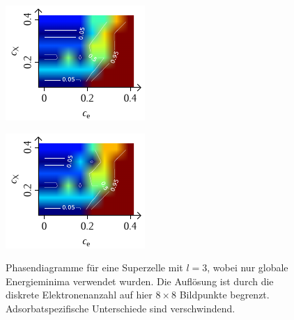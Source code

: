 \documentclass[a4paper, 10pt, twoside, openany]{book} %
\begin{document}
\begin{figure}[b]
    \begin{minipage}[t]{0.31\textwidth}
        \includegraphics[width=\textwidth]{Abbildungen/Phasendiagramme/Exakt/H_P.pdf}
        \label{HPx}
    \end{minipage}
    \hfill
    \parbox[b]{0.3\textwidth}{
        \caption[Phasendiagramme für globale Minima kleiner Systeme]{Phasendiagramme für eine Superzelle mit $l = 3$, wobei nur globale Energieminima verwendet wurden. Die Auflösung ist durch die diskrete Elektronenanzahl auf hier $8 \times 8$ Bildpunkte begrenzt. Adsorbatspezifische Unterschiede sind verschwindend.}
        \vspace{-1.5pc}
        \label{exakte Phasen}
        }
    \hfill
    \begin{minipage}[t]{0.31\textwidth}
        \includegraphics[width=\textwidth]{Abbildungen/Phasendiagramme/Exakt/F_P.pdf}
        \label{FPx}
    \end{minipage}


\end{figure}
\end{document}
